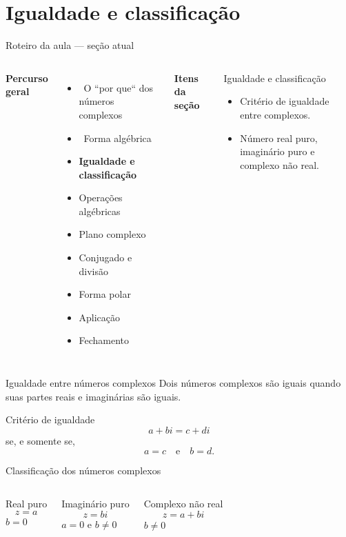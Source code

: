 \documentclass[aspectratio=169]{beamer}
\newcommand{\secaoPassada}[1]{{\color{ThemeSecondary}\checkmark\ #1}}
\newcommand{\secaoAtual}[1]{{\color{ThemeAccent}\textbf{\large #1}}}
\newcommand{\secaoFutura}[1]{{\color{ThemeDark!55}#1}}
\newcommand{\MapaSecao}[3]{%
\begin{frame}{Roteiro da aula — seção atual}
\vspace{-0.55em}
\begin{columns}[T,onlytextwidth]
\column{0.54\textwidth}
\footnotesize
\textbf{Percurso geral}\par\vspace{0.25em}
#1
\column{0.03\textwidth}
\column{0.35\textwidth}
\footnotesize
\textbf{Itens da seção}\par\vspace{0.25cm}
\begin{block}{#2}
#3
\end{block}
\column{0.03\textwidth}
\end{columns}
\end{frame}
}
\begin{document}
\section{Igualdade e classificação}

\MapaSecao{
\begin{itemize}
  \item \secaoPassada{O ``por que`` dos números complexos}
  \item \secaoPassada{Forma algébrica}
  \item \secaoAtual{Igualdade e classificação}
  \item \secaoFutura{Operações algébricas}
  \item \secaoFutura{Plano complexo}
  \item \secaoFutura{Conjugado e divisão}
  \item \secaoFutura{Forma polar}
  \item \secaoFutura{Aplicação}
  \item \secaoFutura{Fechamento}
\end{itemize}
}{Igualdade e classificação}{
\begin{itemize}
  \item Critério de igualdade entre complexos.
  \item Número real puro, imaginário puro e complexo não real.
\end{itemize}
}

\begin{frame}{Igualdade entre números complexos}
\vspace{-0.3em}
\small
Dois números complexos são iguais quando suas partes reais e imaginárias são iguais.

\vspace{0.6em}
\begin{block}{Critério de igualdade}
\[
  a+bi=c+di
\]
se, e somente se,
\[
  a=c \quad \text{e} \quad b=d.
\]
\end{block}
\end{frame}

\begin{frame}{Classificação dos números complexos}
\vspace{-0.4em}
\small
\begin{columns}[T,onlytextwidth]
\begin{block}{Real puro}
\[
  z=a
\]
\centering $b=0$
\end{block}

\begin{block}{Imaginário puro}
\[
  z=bi
\]
\centering $a=0$ e $b\neq 0$
\end{block}

\begin{block}{Complexo não real}
\[
  z=a+bi
\]
\centering $b\neq 0$
\end{block}
\end{columns}
\end{frame}
\end{document}

